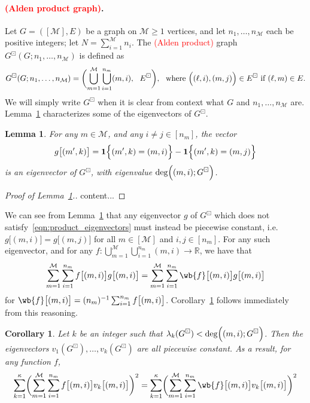 \documentclass{article}
\newcommand{\Reals}{\mathbb{R}}
\newcommand{\1}{\mathbf{1}}
\newcommand{\mc}[1]{\mathcal{#1}}
\theoremstyle{alden}
\theoremstyle{aldenthm}
\newtheorem{lemma}{Lemma}
\newtheorem{corollary}{Corollary}
\theoremstyle{definition}
\theoremstyle{remark}
\begin{document}
\paragraph{\textcolor{red}{(Alden product graph)}.}
Let $G = ([\mc{M}],E)$ be a graph on $\mc{M} \geq 1$ vertices, and let $n_1, \ldots, n_{\mc{M}}$ each be positive integers; let $N = \sum_{i = 1}^{\mc{M}} n_i$.  The \textcolor{red}{(Alden product)} graph $G^{\boxdot}(G;n_1,\ldots,n_{\mc{M}})$ is defined as
\begin{equation*}
G^{\boxdot}(G;n_1,\ldots,n_{\mc{M}}) = \biggl(\bigcup_{m = 1}^{\mc{M}} \bigcup_{i = 1}^{n_m} (m,i),~~ E^{\boxdot}\biggr),~~\textrm{where}~ \Bigl((\ell,i),(m,j)\Bigr) \in E^{\boxdot}~\textrm{if}~ (\ell,m) \in E.
\end{equation*}
We will simply write $G^{\boxdot}$ when it is clear from context what $G$ and $n_1,\ldots,n_{\mc{M}}$ are. Lemma~\ref{lem:product_eigenvectors} characterizes some of the eigenvectors of $G^{\boxdot}$.
\begin{lemma}
	\label{lem:product_eigenvectors}
	For any $m \in \mc{M}$, and any $i \neq j \in [n_{m}]$, the vector
	\begin{equation}
	\label{eqn:product_eigenvectors}
	g\bigl[(m',k)\bigr] = \1\Bigl\{(m',k) = (m,i)\Bigr\} - \1\Bigl\{(m',k) = (m,j)\Bigr\}
	\end{equation}
	is an eigenvector of $G^{\boxdot}$, with eigenvalue $\deg\Bigl((m,i);G^{\boxdot}\Bigr)$.
\end{lemma}
\begin{proof}[Proof of Lemma~\ref{lem:product_eigenvectors}.]
	content...
\end{proof}
We can see from Lemma~\ref{lem:product_eigenvectors} that any eigenvector $g$ of $G^{\boxdot}$ which does not satisfy~\eqref{eqn:product_eigenvectors} must instead be piecewise constant, i.e. $g\bigl[(m,i)\bigr] = g\bigl[(m,j)\bigr]$ for all $m \in [\mc{M}]$ and $i,j \in [n_m]$. For any such eigenvector, and for any $f: \bigcup_{m = 1}^{\mc{M}} \bigcup_{i = 1}^{n_m} (m,i) \to \Reals$, we have that
\begin{equation*}
\sum_{m = 1}^{\mc{M}} \sum_{i = 1}^{n_m} f\bigl[(m,i)\bigr] g\bigl[(m,i)\bigr] = \sum_{m = 1}^{\mc{M}} \sum_{i = 1}^{n_m} \wb{f}\bigl[(m,i)\bigr] g\bigl[(m,i)\bigr]
\end{equation*}
for $\wb{f}\bigl[(m,i)\bigr] = (n_m)^{-1} \sum_{i = 1}^{n_m} f\bigl[(m,i)\bigr]$. Corollary~\ref{cor:product_eigenvectors} follows immediately from this reasoning.
\begin{corollary}
	\label{cor:product_eigenvectors}
	Let $k$ be an integer such that $\lambda_k(G^{\boxdot}) < \deg\Bigl((m,i);G^{\boxdot}\Bigr)$. Then the eigenvectors $v_1(G^{\boxdot}),\ldots,v_k(G^{\boxdot})$ are all piecewise constant. As a result, for any function $f$,
	\begin{equation*}
	\sum_{k = 1}^{\kappa} \biggl(\sum_{m = 1}^{\mc{M}} \sum_{i = 1}^{n_m} f\bigl[(m,i)\bigr] v_k\bigl[(m,i)\bigr]\biggr)^2 = \sum_{k = 1}^{\kappa} \biggl(\sum_{m = 1}^{\mc{M}} \sum_{i = 1}^{n_m} \wb{f}\bigl[(m,i)\bigr] v_k\bigl[(m,i)\bigr]\biggr)^2
	\end{equation*}
\end{corollary}
\end{document}
